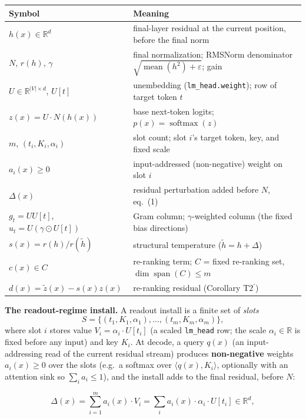 \documentclass[11pt]{article}
\theoremstyle{plain}
\theoremstyle{definition}
\begin{document}
\begin{table}[ht]
\centering
\footnotesize
\begin{tabular}{p{4.5cm}p{8cm}}
\toprule
Symbol & Meaning \\
\midrule
$h(x) \in \mathbb{R}^{d}$ & final-layer residual at the current position, before the final norm \\
$N$, $r(h)$, $\gamma$ & final normalization; RMSNorm denominator $\sqrt{\operatorname{mean}(h^2)+\varepsilon}$; gain \\
$U \in \mathbb{R}^{|V| \times d}$, $U[t]$ & unembedding (\texttt{lm\_head.weight}); row of target token $t$ \\
$z(x) = U \cdot N(h(x))$ & base next-token logits; $p(x)=\operatorname{softmax}(z)$ \\
$m$, $(t_i,K_i,\alpha_i)$ & slot count; slot $i$'s target token, key, and fixed scale \\
$a_i(x) \ge 0$ & input-addressed (non-negative) weight on slot $i$ \\
$\Delta(x)$ & residual perturbation added before $N$, eq.~(1) \\
$g_t = U U[t]$, $u_t = U(\gamma \odot U[t])$ & Gram column; $\gamma$-weighted column (the fixed bias directions) \\
$s(x) = r(h)/r(\tilde h)$ & structural temperature ($\tilde h = h+\Delta$) \\
$c(x) \in C$ & re-ranking term; $C$ = fixed re-ranking set, $\dim \operatorname{span}(C) \le m$ \\
$d(x) = \tilde z(x) - s(x) z(x)$ & re-ranking residual (Corollary T2$^{\prime}$) \\
\bottomrule
\end{tabular}
\end{table}

\textbf{The readout-regime install.} A readout install is a finite set of \emph{slots}
\[ S = \{(t_1,K_1,\alpha_1), \dots, (t_m,K_m,\alpha_m)\}, \]
where slot $i$ stores value $V_i = \alpha_i \cdot U[t_i]$ (a scaled \texttt{lm\_head} row; the scale $\alpha_i \in \mathbb{R}$ is fixed before any input) and key $K_i$. At decode, a query $q(x)$ (an input-addressing read of the current residual stream) produces \textbf{non-negative} weights $a_i(x) \ge 0$ over the slots (e.g.\ a softmax over $\langle q(x),K_i\rangle$, optionally with an attention sink so $\sum_i a_i \le 1$), and the install adds to the final residual, before $N$:

\begin{equation}\tag{1}
\Delta(x) = \sum_{i=1}^{m} a_i(x) \cdot V_i = \sum_i a_i(x) \cdot \alpha_i \cdot U[t_i] \in \mathbb{R}^{d},
\end{equation}
\end{document}
